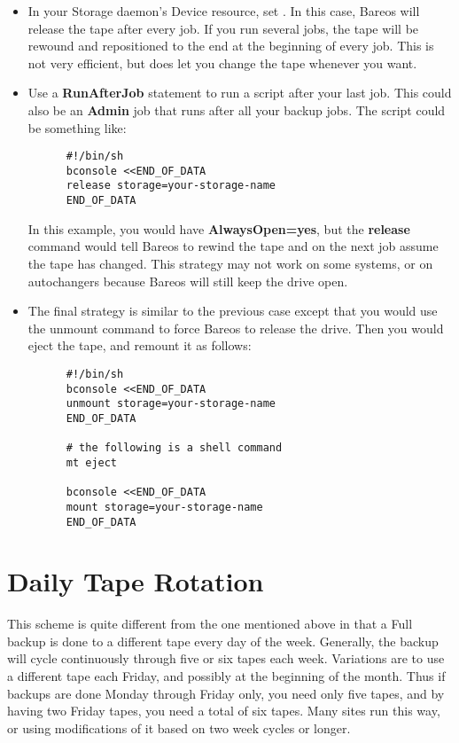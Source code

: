 \begin{itemize}
\item In your Storage daemon's Device resource, set
   .
   In this case, Bareos will release the tape after  every job. If you run
   several jobs, the tape will be  rewound and repositioned to the end at the
   beginning  of every job. This is not very efficient, but does let  you change
   the tape whenever you want.
\item Use a {\bf RunAfterJob} statement to run a script after  your last job.
   This could also be an {\bf Admin}  job that runs after all your backup jobs.
   The script could be  something like:

\footnotesize
\begin{verbatim}
      #!/bin/sh
      bconsole <<END_OF_DATA
      release storage=your-storage-name
      END_OF_DATA
\end{verbatim}
\normalsize

In this example, you would have {\bf AlwaysOpen=yes},  but the {\bf release}
command would tell Bareos to  rewind the tape and on the next job assume the
tape  has changed. This strategy may not work on some systems,  or on
autochangers because Bareos will still keep the  drive open.
\item The final strategy is similar to the previous  case except that you
   would use the unmount command  to force Bareos to release the drive. Then you
   would  eject the tape, and remount it as follows:

\footnotesize
\begin{verbatim}
      #!/bin/sh
      bconsole <<END_OF_DATA
      unmount storage=your-storage-name
      END_OF_DATA

      # the following is a shell command
      mt eject

      bconsole <<END_OF_DATA
      mount storage=your-storage-name
      END_OF_DATA
\end{verbatim}
\normalsize

\end{itemize}

\label{Daily}

\section{Daily Tape Rotation}

This scheme is quite different from the one mentioned above in that a Full
backup is done to a different tape every day of the week. Generally, the
backup will cycle continuously through five or six tapes each week. Variations are
to use a different tape each Friday, and possibly at the beginning of the
month. Thus if backups are done Monday through Friday only, you need only five
tapes, and by having two Friday tapes, you need a total of six tapes. Many sites
run this way, or using modifications of it based on two week cycles or longer.


